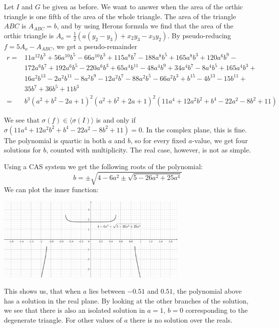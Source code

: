 \begin{example}\upshape
  Let $I$ and $G$ be given as before. We want to answer when the area of the orthic triangle is one fifth of the area of the whole triangle. The area of the triangle $ABC$ is $A_{ABC} = b$, and by using Herons formula we find that the area of the orthic triangle is $A_{o} = \frac{1}{2}(a(y_{2} - y_{3}) + x_{2} y_{3} - x_{3} y_{2})$. By pseudo-reducing $f = 5 A_{o} - A_{ABC}$, we get a pseudo-remainder
  \begin{align*}
    r = &11 a^{12} b^3 + 56 a^{10} b^5 - 66 a^{10} b^3 + 115 a^8 b^7 - 188 a^8 b^5 + 165 a^8 b^3 + 120 a^6 b^9 -\\
        &172 a^6 b^7 + 192 a^6 b^5 - 220 a^6 b^3 + 65 a^4 b^{11} - 48 a^4 b^9 + 34 a^4 b^7 - 8 a^4 b^5 + 165 a^4 b^3 + \\
        &16 a^2 b^{13} - 2 a^2 b^{11} - 8 a^2 b^9 - 12 a^2 b^7 - 88 a^2 b^5 - 66 a^2 b^3 + b^{15} - 4 b^{13} - 15 b^{11} +\\
        &35 b^7 + 36 b^5 + 11 b^3 \\
    = &b^{3}(a^{2} + b^{2} - 2a + 1)^{2} (a^{2} + b^{2} + 2a + 1)^{2} (11a^{4} + 12a^{2}b^{2} + b^{4} - 22a^{2} - 8b^{2} + 11)
  \end{align*}

  We see that $\sigma(f) \in \langle \sigma(I) \rangle$ is and only if $\sigma(11a^{4} + 12a^{2}b^{2} + b^{4} - 22a^{2} - 8b^{2} + 11) = 0$. In the complex plane, this is fine. The polynomial is quartic in both $a$ and $b$, so for every fixed $a$-value, we get four solutions for $b$, counted with multiplicity. The real case, however, is not as simple.

  Using a CAS system we get the following roots of the polynomial:
  \[b = \pm \sqrt{4 - 6 a^2 \pm \sqrt{5 - 26 a^2 + 25 a^4}}\]
  We can plot the inner function:

  \begin{center}
    \includegraphics[width=0.7\textwidth]{geogebra_sqrt.png}
  \end{center}
  This shows us, that when $a$ lies between $-0.51$ and $0.51$, the polynomial above has a solution in the real plane. By looking at the other branches of the solution, we see that there is also an isolated solution in $a = 1$, $b = 0$ corresponding to the degenerate triangle. For other values of $a$ there is no solution over the reals.


\end{example}
